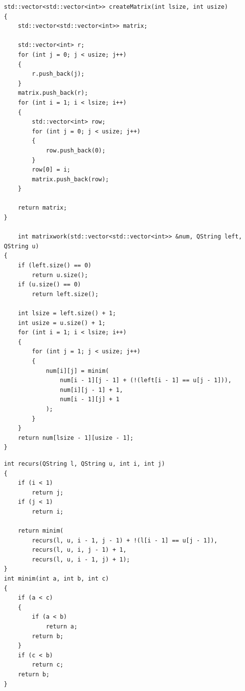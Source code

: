 \documentclass[a4paper, 14pt]{article}
\begin{document}
	\begin{lstlisting}[label=matrix-lev,caption=Матричная реализация алгорима Левенштейна]
    std::vector<std::vector<int>> createMatrix(int lsize, int usize)
{
    std::vector<std::vector<int>> matrix;

    std::vector<int> r;
    for (int j = 0; j < usize; j++)
    {
        r.push_back(j);
    }
    matrix.push_back(r);
    for (int i = 1; i < lsize; i++)
    {
        std::vector<int> row;
        for (int j = 0; j < usize; j++)
        {
            row.push_back(0);
        }
        row[0] = i;
        matrix.push_back(row);
    }

    return matrix;
}
	
    int matrixwork(std::vector<std::vector<int>> &num, QString left, QString u)
{
    if (left.size() == 0)
        return u.size();
    if (u.size() == 0)
        return left.size();

    int lsize = left.size() + 1;
    int usize = u.size() + 1;
    for (int i = 1; i < lsize; i++)
    {
        for (int j = 1; j < usize; j++)
        {
            num[i][j] = minim(
                num[i - 1][j - 1] + (!(left[i - 1] == u[j - 1])),
                num[i][j - 1] + 1,
                num[i - 1][j] + 1
            );
        }
    }
    return num[lsize - 1][usize - 1];
}
	\end{lstlisting}
	
	\newpage
	\begin{lstlisting}[label=recur-lev,caption=Рекурсивная реализация алгорима Левенштейна]
    int recurs(QString l, QString u, int i, int j)
{
    if (i < 1)
        return j;
    if (j < 1)
        return i;

    return minim(
        recurs(l, u, i - 1, j - 1) + !(l[i - 1] == u[j - 1]),
        recurs(l, u, i, j - 1) + 1,
        recurs(l, u, i - 1, j) + 1);
}
int minim(int a, int b, int c)
{
    if (a < c)
    {
        if (a < b)
            return a;
        return b;
    }
    if (c < b)
        return c;
    return b;
}
	\end{lstlisting}
	
\end{document}
